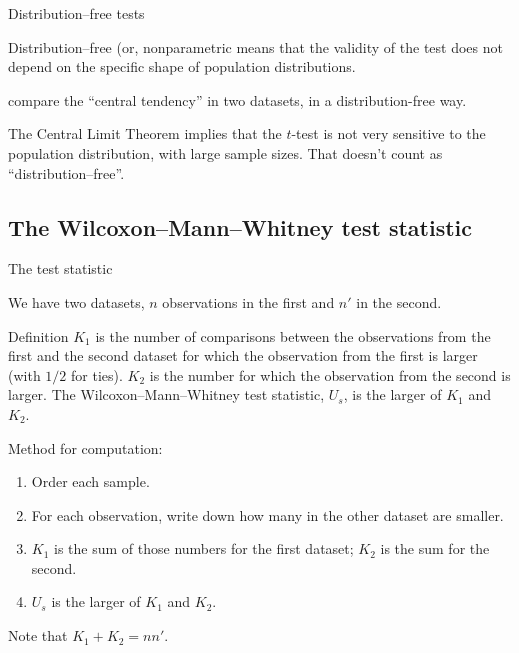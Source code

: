 \begin{frame}{Distribution--free tests}
  \begin{block}{Distribution--free (or, nonparametric}
    means that the validity of the test does not depend on the specific shape of population distributions.
  \end{block}

    \vspace{2em}

     compare the ``central tendency'' in two datasets,
    in a distribution-free way.

    \vspace{3em}

     The Central Limit Theorem implies that the $t$-test is not very sensitive to the population distribution, with large sample sizes.  That doesn't count as ``distribution--free''.

\end{frame}

\subsection{The Wilcoxon--Mann--Whitney test statistic}

\begin{frame}{The test statistic}

    We have two datasets, %
    $n$ observations in the first and $n'$ in the second.

  \begin{block}{Definition}
    $K_1$ is the number of comparisons between the observations from the first and the second dataset for which the observation from the first is larger (with $1/2$ for ties). 
    $K_2$ is the number for which the observation from the second is larger.
    The Wilcoxon--Mann--Whitney test statistic, $U_s$, 
    is the larger of $K_1$ and $K_2$.
  \end{block}


    \vspace{1em}

    Method for computation:
    \begin{enumerate}
      \item Order each sample.
      \item For each observation, write down how many in the other dataset are smaller.
      \item $K_1$ is the sum of those numbers for the first dataset; $K_2$ is the sum for the second.
      \item $U_s$ is the larger of $K_1$ and $K_2$.
    \end{enumerate}

    \vspace{1em}

    Note that $K_1 + K_2 = n n'$.

\end{frame}

